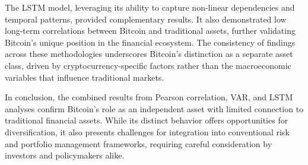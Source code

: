 \documentclass{article}
\begin{document}
The LSTM model, leveraging its ability to capture non-linear dependencies and temporal patterns, provided complementary results. It also demonstrated low long-term correlations between Bitcoin and traditional assets, further validating Bitcoin’s unique position in the financial ecosystem. The consistency of findings across these methodologies underscores Bitcoin's distinction as a separate asset class, driven by cryptocurrency-specific factors rather than the macroeconomic variables that influence traditional markets.

In conclusion, the combined results from Pearson correlation, VAR, and LSTM analyses confirm Bitcoin's role as an independent asset with limited connection to traditional financial assets. While its distinct behavior offers opportunities for diversification, it also presents challenges for integration into conventional risk and portfolio management frameworks, requiring careful consideration by investors and policymakers alike.




\newpage


\end{document}
